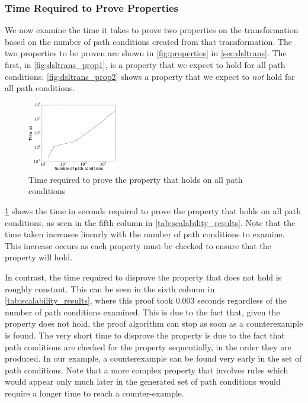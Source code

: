 \subsubsection{Time Required to Prove Properties}

We now examine the time it takes to prove two properties on the transformation based on the number of path conditions created from that transformation. The two properties to be proven are shown in \cref{fig:properties} in \cref{sec:dsltrans}. The first, in \cref{fig:dsltrans_prop1}, is a property that we expect to hold for all path conditions. \cref{fig:dsltrans_prop2} shows a property that we expect to \emph{not} hold for all path conditions. 

\begin{figure}[bht] \centering \includegraphics[width=0.35\textwidth]{./figures/results/pcs_vs_prop1.pdf}
	\caption{Time required to prove the property that holds on all path conditions}
	\label{fig:pcs_vs_prop1}
\end{figure}

\cref{fig:pcs_vs_prop1} shows the time in seconds required to prove the property that holds on all path conditions, as seen in the fifth column in \cref{tab:scalability_results}. Note that the time taken increases linearly with the number of path conditions to examine. This increase occurs as each property must be checked to ensure that the property will hold.

In contrast, the time required to disprove the property that does not hold is roughly constant. This can be seen in the sixth column in \cref{tab:scalability_results}, where this proof took 0.003 seconds regardless of the number of path conditions examined. This is due to the fact that, given the property does not hold, the proof algorithm can stop as soon as a counterexample is found. The very short time to disprove the property is due to the fact that path conditions are checked for the property sequentially, in the order they are produced. In our example, a counterexample can be found very early in the set of path conditions. Note that a more complex property that involves rules which would appear only much later in the generated set of path conditions would require a longer time to reach a counter-example.


